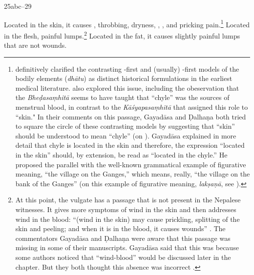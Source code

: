 \begin{translation}
\item[25abc--29] 

Located in the skin, it causes ,
throbbing, dryness, , ,
and pricking pain.\footnote{\citet{maas-2008} definitively clarified
    the contrasting -first and (usually) -first models
    of the bodily elements (\emph{dhātu}) as
    distinct historical formulations in the earliest medical literature.
    \cite[267--282]{das-2003} also explored this issue, including the
    obeservation that the \emph{Bheḍasaṃhitā} seems to have taught that
     “chyle”  was the sources of menstrual blood, in contrast to
    the \emph{Kāśyapasaṃhitā} that assigned this role to 
    “skin." In their comments on this passage, Gayadāsa and Ḍalhaṇa both
    tried to square the circle of these contrasting models by suggesting
    that  “skin” should be understood to mean  “chyle”
    (on ). Gayadāsa explained in more detail that chyle is
    located in the skin and therefore, the expression 
    “located in the skin” should, by extension, be read as 
    “located in the chyle.”  He proposed the parallel with the well-known
    grammatical example of figurative meaning,  “the
    village on the Ganges,” which means, really, “the village on the bank
    of the Ganges” (on this example of figurative meaning, \emph{lakṣaṇā},
    see \cites[698--699]{jhal-1978}[ch.\,6]{kunj-1963}).  } Located in the
    flesh, painful lumps.\footnote{At this point, the vulgate has a
        passage that is not present in the Nepalese witnesses.  It gives more
        symptoms of wind in the skin and then addresses wind in the blood:
        “(wind in the skin) may cause prickling, splitting of the skin and
        peeling; and when it is in the blood, it causes wounds”
        \citep[261]{vulgate}. \label{ancient-variants}The commentators
        Gayadāsa and Ḍalhaṇa were aware that this passage was missing in some
        of their manuscripts. Gayadāsa said that this was because some authors
        noticed that  “wind-blood” would be discussed later in
        the chapter. But they both thought this absence was incorrect
        \citep[262]{vulgate}.} Located in the fat, it causes slightly painful
        lumps that are not wounds.
        

\end{translation}
